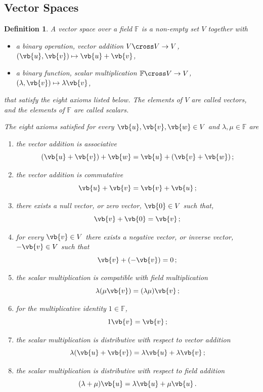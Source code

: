 \documentclass{article}
\theoremstyle{plain}\theoremheaderfont{\normalfont\itshape}\theorembodyfont{\rmfamily}\theoremseparator{.}\newtheorem*{rem}{Remark}\newtheorem*{ex}{Example}\newtheorem*{proof}{Proof}\newtheorem*{altp}{Alternative proof}
\theoremstyle{plain}\theoremheaderfont{\normalfont\bfseries}\theorembodyfont{\rmfamily}\theoremseparator{.}\newtheorem{thm}{Theorem}[section]\newtheorem{lem}[thm]{Lemma}\newtheorem{prop}[thm]{Proposition}\newtheorem*{cor}{Corollary}\newtheorem{defn}[thm]{Definition}\newtheorem{clm}[thm]{Claim}\newtheorem{clminproof}{Claim}
\theoremstyle{break}\theoremheaderfont{\normalfont\itshape}\theorembodyfont{\rmfamily}\theoremseparator{.\medskip}\newtheorem*{proofskip}{Proof}\newtheorem*{exs}{Examples}\newtheorem*{rems}{Remarks}
\theoremstyle{break}\theoremheaderfont{\normalfont\bfseries}\theorembodyfont{\rmfamily}\theoremseparator{.\medskip}\newtheorem{lemskip}[thm]{Lemma}\newtheorem{defnskip}[thm]{Definition}\newtheorem{propskip}[thm]{Proposition}\newtheorem{thmskip}[thm]{Theorem}
\numberwithin{equation}{section}
\begin{document}
	\subsection{Vector Spaces}
	\begin{defn}
		A \textit{vector space} over a field \(\mathbb{F}\) is a non-empty set \(V\) together with
		\begin{itemize}[topsep=-5pt]
			\item a binary operation, \textit{vector addition} \(V\cross V\to V\), \((\vb{u},\vb{v})\mapsto \vb{u}+\vb{v}\),
			\item a binary function, \textit{scalar multiplication} \(\mathbb{F}\cross V\to V\), \((\lambda,\vb{v})\mapsto \lambda\vb{v}\),
		\end{itemize}
		that satisfy the eight axioms listed below. The elements of \(V\) are called \textit{vectors}, and the elements of \(\mathbb{F}\) are called \textit{scalars}.

		The eight axioms satisfied for every \(\vb{u},\vb{v},\vb{w}\in V\) and \(\lambda,\mu\in\mathbb{F}\) are		
		\begin{enumerate}[topsep=0pt]
			\item[(V1)] the vector addition is \textit{associative} 
			\[(\vb{u}+\vb{v})+\vb{w}=\vb{u}+(\vb{v}+\vb{w})\,;\]
			\item[(V2)] the vector addition is \textit{commutative}
			\[\vb{u}+\vb{v}=\vb{v}+\vb{u}\,;\]
			\item[(V3)] there exists a \textit{null vector}, or \textit{zero vector}, \(\vb{0}\in V\) such that,
			\[\vb{v}+\vb{0}=\vb{v}\,;\]
			\item[(V4)] for every \(\vb{v}\in V\) there exists a \textit{negative vector}, or \textit{inverse vector}, \(-\vb{v}\in V\) such that
			\[\vb{v}+(-\vb{v})=0\,;\]
			\item[(V5)] the scalar multiplication is \textit{compatible with field multiplication}
			\[\lambda(\mu\vb{v})=(\lambda\mu)\vb{v}\,;\]
			\item[(V6)] for the multiplicative identity \(1\in\mathbb{F}\),
			\[1\vb{v}=\vb{v}\,;\]
			\item[(V7)] the scalar multiplication is \textit{distributive} with respect to vector addition
			\[\lambda(\vb{u}+\vb{v})=\lambda\vb{u}+\lambda\vb{v}\,;\]
			\item[(V8)] the scalar multiplication is \textit{distributive} with respect to field addition 
			\[(\lambda+\mu)\vb{u}=\lambda\vb{u}+\mu\vb{u}\,.\]
		\end{enumerate}
	\end{defn}
\end{document}
